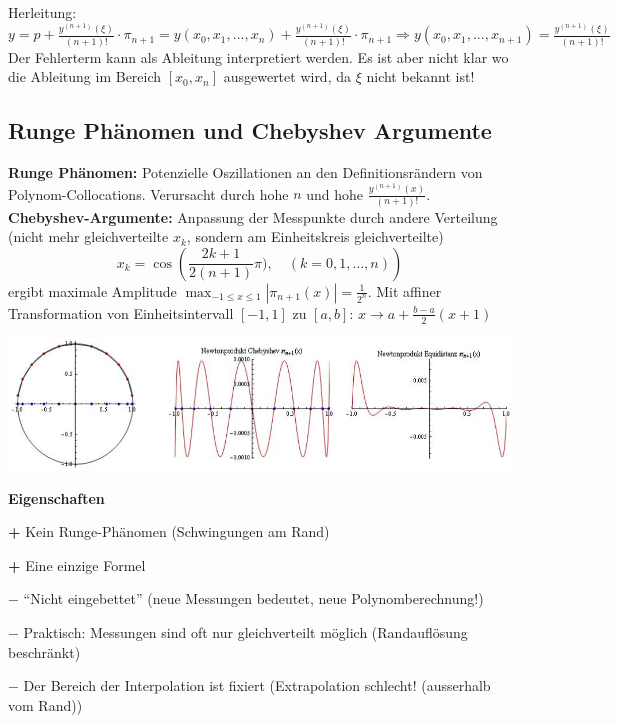 Herleitung: $y = p + \frac{y^{(n+1)}(\xi)}{(n+1)!} \cdot \pi_{n+1} = y(x_0,x_1,...,x_n) + \frac{y^{(n+1)}(\xi)}{(n+1)!} \cdot \pi_{n+1} \Longrightarrow y(x_0,x_1,...,x_{n+1}) = \frac{y^{(n+1)}(\xi)}{(n+1)!}$\\

Der Fehlerterm kann als Ableitung interpretiert werden. Es ist aber nicht klar wo die Ableitung im Bereich $[x_0,x_n]$ ausgewertet wird, da $\xi$ nicht bekannt ist!

\subsection{Runge Phänomen und Chebyshev Argumente}
\textbf{Runge Phänomen:} Potenzielle Oszillationen an den Definitionsrändern von Polynom-Collocations.
Verursacht durch hohe $n$ und hohe $\frac{y^{(n+1)}(x)}{(n+1)!}$. \\
\textbf{Chebyshev-Argumente:} Anpassung der Messpunkte durch andere Verteilung (nicht mehr gleichverteilte $x_k$, sondern am Einheitskreis gleichverteilte)
\[x_k = \cos({\frac{2k+1}{2(n+1)}\pi), \quad (k=0,1,\ldots,n)}) \]
ergibt maximale Amplitude $\max_{-1\leq x\leq 1}|\pi_{n+1}(x)| = \frac{1}{2^n}$. 
Mit affiner Transformation von Einheitsintervall $[-1,1]$ zu $[a,b]$: $x \rightarrow a+\frac{b-a}{2}(x+1)$
\begin{center}
\includegraphics[width=14cm]{bilder/TschbyNewtonVergleich.png}
\end{center}

\textbf{Eigenschaften}
\begin{liste}
  \item[\textbf{+}] Kein Runge-Phänomen (Schwingungen am Rand)
  \item[\textbf{+}] Eine einzige Formel
  \item[$\mathbf{-}$] "`Nicht eingebettet"' (neue Messungen bedeutet, neue Polynomberechnung!)
  \item[$\mathbf{-}$] Praktisch: Messungen sind oft nur gleichverteilt möglich (Randauflösung beschränkt)
  \item[$\mathbf{-}$] Der Bereich der Interpolation ist fixiert (Extrapolation schlecht! (ausserhalb vom Rand))
\end{liste}


